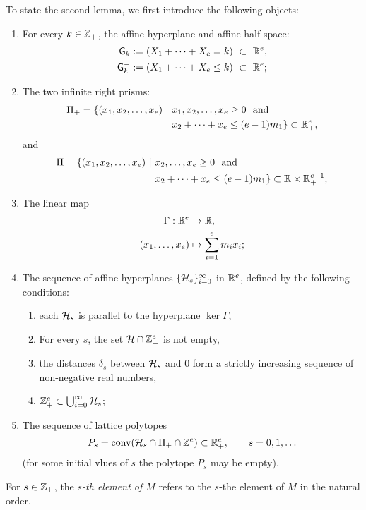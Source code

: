 To state the second lemma, we first introduce the following objects:
\begin{enumerate}[label=(\alph*)]
\item For every $k\in\mathbb Z_+$, the affine hyperplane and affine half-space:
\begin{align*}
\mathsf{G}_k:=(X_1+\cdots+X_e=k)\ \subset\ \mathbb R^e,\\
\mathsf{G}_k^-:=(X_1+\cdots+X_e\le k)\ \subset\ \mathbb R^e;
\end{align*}
\item The two infinite right prisms:
\begin{align*}
\Pi_+=\{(x_1,x_2,\ldots,x_e)\ |\ &x_1,x_2,\ldots,x_e\ge0\ \ \text{and}\\ 
&x_2+\cdots+x_e\le (e-1)m_1\}\subset\RR_+^e,
\end{align*}
and
\begin{align*}
\Pi=\{(x_1,x_2,\ldots,x_e)\ |\ &x_2,\ldots,x_e\ge0\ \ \text{and}\\ 
&x_2+\cdots+x_e\le (e-1)m_1\}\subset\mathbb R\times\mathbb R_+^{e-1};
\end{align*}
\item
The linear map 
\begin{align*}
\Gamma:\mathbb R^e&\to\mathbb R,\\
(x_1,\ldots,x_e)&\mapsto\sum_{i=1}^em_ix_i;
\end{align*} 
\item
The sequence of affine hyperplanes $\{\mathcal{H}_s\}_{i=0}^\infty$ in $\mathbb R^e$, defined by the following conditions:
\begin{enumerate}[label=(\alph*)]
\item
each $\mathcal{H}_s$ is parallel to the hyperplane $\ker\Gamma$,
\item For every $s$, the set $\mathcal{H}\cap\mathbb Z^e_+$ is not empty,
\item
the distances $\delta_s$ between $\mathcal{H}_s$ and $0$ form a strictly increasing sequence of non-negative real numbers,
\item 
$\mathbb Z_+^e\subset\bigcup_{i=0}^\infty\mathcal{H}_s$;
\end{enumerate}
\item
The sequence of lattice polytopes
\begin{align*}
P_s=\operatorname{conv}(\mathcal{H}_s\cap\Pi_+\cap\mathbb Z^e)\subset\mathbb R_+^e,\qquad s=0,1,\ldots
\end{align*}
(for some initial vlues of $s$ the polytope $P_s$ may be empty).
\end{enumerate}

For $s\in\mathbb Z_+$, the \emph{$s$-th element of $M$} refers to the $s$-the element of $M$ in the natural order.

